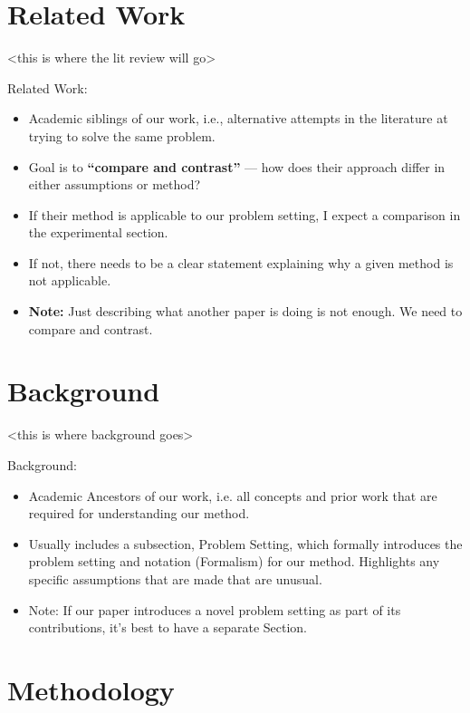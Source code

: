\documentclass{article}
\begin{document}
\section{Related Work}



<this is where the lit review will go>

Related Work:

\begin{itemize}
    \item Academic siblings of our work, i.e., alternative attempts in the literature at trying to solve the same problem.
    \item Goal is to \textbf{“compare and contrast”} — how does their approach differ in either assumptions or method?
    \item If their method is applicable to our problem setting, I expect a comparison in the experimental section.
    \item If not, there needs to be a clear statement explaining why a given method is not applicable.
    \item \textbf{Note:} Just describing what another paper is doing is not enough. We need to compare and contrast.
\end{itemize}

\section{Background}

<this is where background goes>

Background:
\begin{itemize}
    \item Academic Ancestors of our work, i.e. all concepts and prior work that are required for understanding our method. 
    \item Usually includes a subsection, Problem Setting, which formally introduces the problem setting and notation (Formalism) for our method. Highlights any specific assumptions that are made that are unusual. 
    \item Note: If our paper introduces a novel problem setting as part of its contributions, it’s best to have a separate Section.
\end{itemize}


\section{Methodology}
\end{document}
